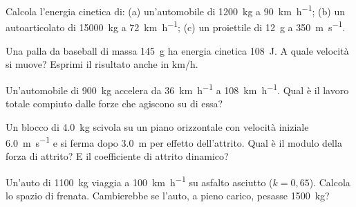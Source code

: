 \begin{esercizio}
Calcola l'energia cinetica di: (a) un'automobile di \SI{1200}{\kilo\gram} a \SI{90}{\kilo\metre\per\hour}; (b) un autoarticolato di \SI{15000}{\kilo\gram} a \SI{72}{\kilo\metre\per\hour}; (c) un proiettile di \SI{12}{\gram} a \SI{350}{\metre\per\second}.\\
\end{esercizio}

\begin{esercizio}
Una palla da baseball di massa \SI{145}{\gram} ha energia cinetica \SI{108}{\joule}. A quale velocità si muove? Esprimi il risultato anche in km/h.\\
\end{esercizio}

\begin{esercizio}
Un'automobile di \SI{900}{\kilo\gram} accelera da \SI{36}{\kilo\metre\per\hour} a \SI{108}{\kilo\metre\per\hour}. Qual è il lavoro totale compiuto dalle forze che agiscono su di essa?\\
\end{esercizio}

\begin{esercizio}
Un blocco di \SI{4,0}{\kilo\gram} scivola su un piano orizzontale con velocità iniziale \SI{6,0}{\metre\per\second} e si ferma dopo \SI{3,0}{\metre} per effetto dell'attrito. Qual è il modulo della forza di attrito? E il coefficiente di attrito dinamico?\\
\end{esercizio}

\begin{esercizio}
Un'auto di \SI{1100}{\kilo\gram} viaggia a \SI{100}{\kilo\metre\per\hour} su asfalto asciutto ($k = 0{,}65$). Calcola lo spazio di frenata. Cambierebbe se l'auto, a pieno carico, pesasse \SI{1500}{\kilo\gram}?\\
\end{esercizio}

